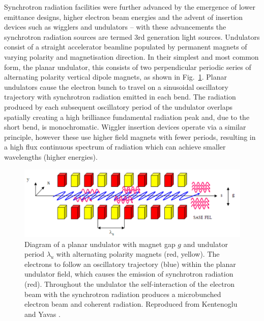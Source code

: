 \documentclass[../main.tex]{subfiles}
\begin{document}
Synchrotron radiation facilities were further advanced by the emergence of lower emittance designs, higher electron beam energies and the advent of insertion devices such as wigglers and undulators -- with these advancements the synchrotron radiation sources are termed 3rd generation light sources. Undulators consist of a straight accelerator beamline populated by permanent magnets of varying polarity and magnetisation direction. In their simplest and most common form, the planar undulator, this consists of two perpendicular periodic series of alternating polarity vertical dipole magnets, as shown in Fig.~\ref{fig:planar_undulator}. Planar undulators cause the electron bunch to travel on a sinusoidal oscillatory trajectory with synchrotron radiation emitted in each bend. The radiation produced by each subsequent oscillatory period of the undulator overlaps spatially creating a high brilliance fundamental radiation peak and, due to the short bend, is monochromatic. Wiggler insertion devices operate via a similar principle, however these use higher field magnets with fewer periods, resulting in a high flux continuous spectrum of radiation which can achieve smaller wavelengths (higher energies). 

\begin{figure}[!h]
\centering
\includegraphics[width=\textwidth]{Figures/Introduction/Planar_Undulator.pdf}
\caption{Diagram of a planar undulator with magnet gap $g$ and undulator period $\lambda_{u}$ with alternating polarity magnets (red, yellow). The electrons to follow an oscillatory trajectory (blue) within the planar undulator field, which causes the emission of synchrotron radiation (red). Throughout the undulator the self-interaction of the electron beam with the synchrotron radiation produces a microbunched electron beam and coherent radiation. Reproduced from Kentenoglu and Yavas \cite{ketenoglu2010asynchronously}.}
\label{fig:planar_undulator}
\end{figure}
\end{document}
